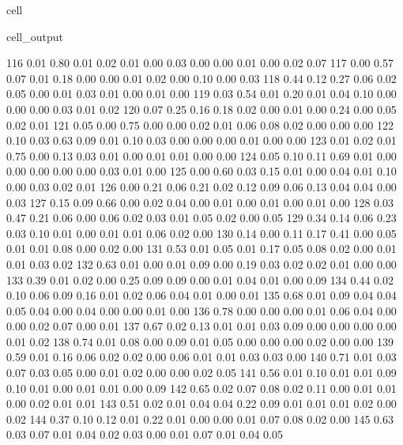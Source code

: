 \documentclass[letterpaper,10pt,french]{sphinxmanual}
\begin{document}
\begin{sphinxuseclass}{cell}
\begin{sphinxuseclass}{cell_output}
\begin{sphinxVerbatim}[commandchars=\\\{\}]
       116	0.01 	0.80 	0.01 	0.02 	0.01 	0.00 	0.03 	0.00 	0.00 	0.01 	0.00 	0.02 	0.07
       117	0.00 	0.57 	0.07 	0.01 	0.18 	0.00 	0.00 	0.01 	0.02 	0.00 	0.10 	0.00 	0.03
       118	0.44 	0.12 	0.27 	0.06 	0.02 	0.05 	0.00 	0.01 	0.03 	0.01 	0.00 	0.01 	0.00
       119	0.03 	0.54 	0.01 	0.20 	0.01 	0.04 	0.10 	0.00 	0.00 	0.00 	0.03 	0.01 	0.02
       120	0.07 	0.25 	0.16 	0.18 	0.02 	0.00 	0.01 	0.00 	0.24 	0.00 	0.05 	0.02 	0.01
       121	0.05 	0.00 	0.75 	0.00 	0.00 	0.02 	0.01 	0.06 	0.08 	0.02 	0.00 	0.00 	0.00
       122	0.10 	0.03 	0.63 	0.09 	0.01 	0.10 	0.03 	0.00 	0.00 	0.00 	0.01 	0.00 	0.00
       123	0.01 	0.02 	0.01 	0.75 	0.00 	0.13 	0.03 	0.01 	0.00 	0.01 	0.01 	0.00 	0.00
       124	0.05 	0.10 	0.11 	0.69 	0.01 	0.00 	0.00 	0.00 	0.00 	0.00 	0.03 	0.01 	0.00
       125	0.00 	0.60 	0.03 	0.15 	0.01 	0.00 	0.04 	0.01 	0.10 	0.00 	0.03 	0.02 	0.01
       126	0.00 	0.21 	0.06 	0.21 	0.02 	0.12 	0.09 	0.06 	0.13 	0.04 	0.04 	0.00 	0.03
       127	0.15 	0.09 	0.66 	0.00 	0.02 	0.04 	0.00 	0.01 	0.00 	0.01 	0.00 	0.01 	0.00
       128	0.03 	0.47 	0.21 	0.06 	0.00 	0.06 	0.02 	0.03 	0.01 	0.05 	0.02 	0.00 	0.05
       129	0.34 	0.14 	0.06 	0.23 	0.03 	0.10 	0.01 	0.00 	0.01 	0.01 	0.06 	0.02 	0.00
       130	0.14 	0.00 	0.11 	0.17 	0.41 	0.00 	0.05 	0.01 	0.01 	0.08 	0.00 	0.02 	0.00
       131	0.53 	0.01 	0.05 	0.01 	0.17 	0.05 	0.08 	0.02 	0.00 	0.01 	0.01 	0.03 	0.02
       132	0.63 	0.01 	0.00 	0.01 	0.09 	0.00 	0.19 	0.03 	0.02 	0.02 	0.01 	0.00 	0.00
       133	0.39 	0.01 	0.02 	0.00 	0.25 	0.09 	0.09 	0.00 	0.01 	0.04 	0.01 	0.00 	0.09
       134	0.44 	0.02 	0.10 	0.06 	0.09 	0.16 	0.01 	0.02 	0.06 	0.04 	0.01 	0.00 	0.01
       135	0.68 	0.01 	0.09 	0.04 	0.04 	0.05 	0.04 	0.00 	0.04 	0.00 	0.00 	0.01 	0.00
       136	0.78 	0.00 	0.00 	0.00 	0.01 	0.06 	0.04 	0.00 	0.00 	0.02 	0.07 	0.00 	0.01
       137	0.67 	0.02 	0.13 	0.01 	0.01 	0.03 	0.09 	0.00 	0.00 	0.00 	0.00 	0.01 	0.02
       138	0.74 	0.01 	0.08 	0.00 	0.09 	0.01 	0.05 	0.00 	0.00 	0.00 	0.02 	0.00 	0.00
       139	0.59 	0.01 	0.16 	0.06 	0.02 	0.02 	0.00 	0.06 	0.01 	0.01 	0.03 	0.03 	0.00
       140	0.71 	0.01 	0.03 	0.07 	0.03 	0.05 	0.00 	0.01 	0.02 	0.00 	0.00 	0.02 	0.05
       141	0.56 	0.01 	0.10 	0.01 	0.01 	0.09 	0.10 	0.01 	0.00 	0.01 	0.01 	0.00 	0.09
       142	0.65 	0.02 	0.07 	0.08 	0.02 	0.11 	0.00 	0.01 	0.01 	0.00 	0.02 	0.01 	0.01
       143	0.51 	0.02 	0.01 	0.04 	0.04 	0.22 	0.09 	0.01 	0.01 	0.01 	0.02 	0.00 	0.02
       144	0.37 	0.10 	0.12 	0.01 	0.22 	0.01 	0.00 	0.00 	0.01 	0.07 	0.08 	0.02 	0.00
       145	0.63 	0.03 	0.07 	0.01 	0.04 	0.02 	0.03 	0.00 	0.01 	0.07 	0.01 	0.04 	0.05

\end{sphinxVerbatim}
\end{sphinxuseclass}
\end{sphinxuseclass}
\end{document}
